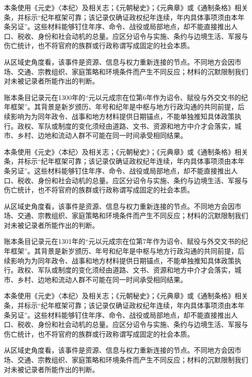本条使用《元史》〈本纪〉及相关志；《元朝秘史》；《元典章》或《通制条格》相关条，并标示“纪年框架可靠；该记录仅确证政权纪年连续，年内具体事项须由本年条另证”。这些材料能够钉住年序、命令、战役或局部地点，却不能直接推出人口、税收、身份和社会动机的总量。应区分诏令与实施、条约与边境生活、军报与伤亡统计，也不将官府的族群或行政称谓写成固定的社会本质。

从区域史角度看，该事件是资源、信息与权力重新连接的节点。不同地方会因市场、交通、宗教组织、家庭策略和环境条件而产生不同反应；材料的沉默限制我们对未被记录者所能作出的判断。

账本条目记录元在1300年的“元以元成宗在位第6年作为诏令、赋役与外交文书的纪年框架”。其背景是新岁颁历、年号和纪年是中枢与地方行政沟通的共同前提，后续影响为为同年政令、战事和地方材料提供日期锚点，不能单独推知具体政策执行。政权、军队或制度的变化须经由道路、文书、资源和地方中介才会落实，城市、乡村、边地和流动人群不可能在同一时间承受相同结果。

本条使用《元史》〈本纪〉及相关志；《元朝秘史》；《元典章》或《通制条格》相关条，并标示“纪年框架可靠；该记录仅确证政权纪年连续，年内具体事项须由本年条另证”。这些材料能够钉住年序、命令、战役或局部地点，却不能直接推出人口、税收、身份和社会动机的总量。应区分诏令与实施、条约与边境生活、军报与伤亡统计，也不将官府的族群或行政称谓写成固定的社会本质。

从区域史角度看，该事件是资源、信息与权力重新连接的节点。不同地方会因市场、交通、宗教组织、家庭策略和环境条件而产生不同反应；材料的沉默限制我们对未被记录者所能作出的判断。

账本条目记录元在1301年的“元以元成宗在位第7年作为诏令、赋役与外交文书的纪年框架”。其背景是新岁颁历、年号和纪年是中枢与地方行政沟通的共同前提，后续影响为为同年政令、战事和地方材料提供日期锚点，不能单独推知具体政策执行。政权、军队或制度的变化须经由道路、文书、资源和地方中介才会落实，城市、乡村、边地和流动人群不可能在同一时间承受相同结果。

本条使用《元史》〈本纪〉及相关志；《元朝秘史》；《元典章》或《通制条格》相关条，并标示“纪年框架可靠；该记录仅确证政权纪年连续，年内具体事项须由本年条另证”。这些材料能够钉住年序、命令、战役或局部地点，却不能直接推出人口、税收、身份和社会动机的总量。应区分诏令与实施、条约与边境生活、军报与伤亡统计，也不将官府的族群或行政称谓写成固定的社会本质。

从区域史角度看，该事件是资源、信息与权力重新连接的节点。不同地方会因市场、交通、宗教组织、家庭策略和环境条件而产生不同反应；材料的沉默限制我们对未被记录者所能作出的判断。

